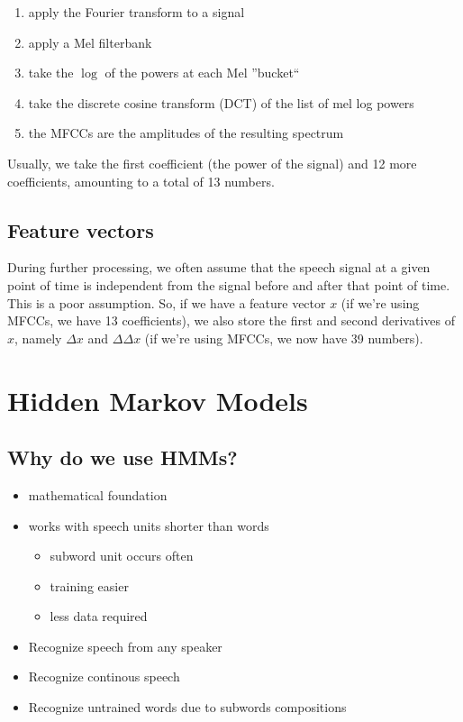 \begin{enumerate}
    \item apply the Fourier transform to a signal
    \item apply a Mel filterbank
    \item take the $\log$ of the powers at each Mel ''bucket``
    \item take the discrete cosine transform (DCT) of the list of mel log powers
    \item the MFCCs are the amplitudes of the resulting spectrum
\end{enumerate}

Usually, we take the first coefficient (the power of the signal) and 12 more coefficients, amounting to a total of 13 numbers.

\subsection{Feature vectors}

During further processing, we often assume that the speech signal at a given point of time is independent from the signal before and after that point of time. This is a poor assumption. So, if we have a feature vector $x$ (if we're using MFCCs, we have 13 coefficients), we also store the first and second derivatives of $x$, namely $\Delta x$ and $\Delta \Delta x$ (if we're using MFCCs, we now have 39 numbers).

\newpage

\section{Hidden Markov Models}

\subsection{Why do we use HMMs?}
\begin{itemize}
\item mathematical foundation
\item works with speech units shorter than words
\begin{itemize}
\item subword unit occurs often
\item training easier
\item less data required
\end{itemize}
\item Recognize speech from any speaker
\item Recognize continous speech
\item Recognize untrained words due to subwords compositions

\end{itemize}


